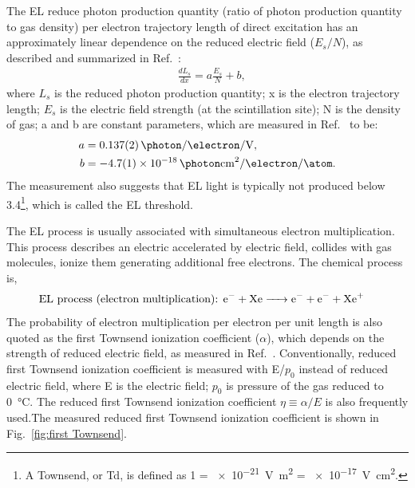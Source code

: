 The EL reduce photon production quantity (ratio of photon production quantity to gas density) per electron trajectory length of direct excitation has an approximately linear dependence on the reduced electric field ($E_s/N$), as described and summarized in Ref.~\cite{Santos1994, Fonseca2004, Monteiro2007, Chepel2013a}:
\begin{align}
&\frac{dL_s}{dx}=a \frac{E_s}{N} + b ,
\end{align} 
where $L_s$ is the reduced photon production quantity; x is the electron trajectory length; $E_s$ is the electric field strength (at the scintillation site); N is the density of gas; a and b are constant parameters,  which are measured in Ref.~\cite{ Fonseca2004, Chepel2013a} to be:  
\begin{align}
a &= \SI[separate-uncertainty=false]{0.137(2)}{\photon\per\electron\per\V} , \\
b &= \SI[separate-uncertainty=false]{-4.7(1) e-18 }{\photon\cm\squared\per\electron\per\atom}. 
\end{align}
The measurement also suggests that EL light is typically not produced below \SI{3.4}{\townsend}\footnote{A Townsend, or Td, is defined as \SI{1}{\townsend} = \SI{e-21} {\V\m\squared} = \SI{e-17}{\V\cm\squared}.}, which is called the EL threshold.

The EL process is usually associated with simultaneous electron multiplication. This process describes an electric accelerated by electric field, collides with gas molecules, ionize them generating additional free electrons. The chemical process is, 
\begin{align}
\text{EL process (electron multiplication): }&\ce{e^- + Xe -> e^- + e^-  +Xe^{+}}
\end{align}
The probability of electron multiplication per electron per unit length is also quoted as the first Townsend ionization coefficient ($\alpha$), which depends on the strength of reduced electric field, as measured in Ref.~\cite{Kruithof1940, Derenzo1974}. Conventionally, reduced first Townsend ionization coefficient is measured with E/$p_0$ instead of reduced electric field, where E is the electric field; $p_0$ is pressure of the gas reduced to \SI{0}{\celsius}. The reduced first Townsend ionization coefficient $\eta \equiv \alpha / E$ is also frequently used.The measured reduced first Townsend ionization coefficient is shown in Fig.~\ref{fig:first Townsend}.

